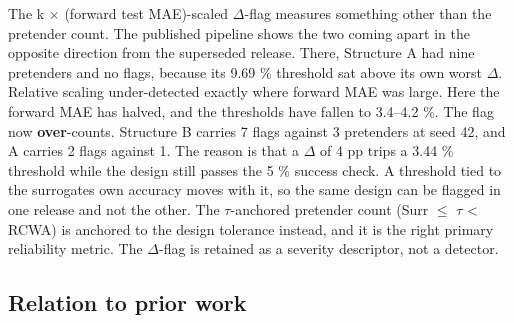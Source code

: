 \documentclass[11pt,a4paper]{article}
\begin{document}
The k \ensuremath{\times} (forward test MAE)-scaled \ensuremath{\Delta}-flag measures something other than the pretender
count. The published pipeline shows the two coming apart in the opposite direction from
the superseded release. There, Structure A had nine pretenders and no flags, because its
9.69 \% threshold sat above its own worst \ensuremath{\Delta}. Relative scaling under-detected exactly where
forward MAE was large. Here the forward MAE has halved, and the thresholds have fallen
to 3.4--4.2 \%. The flag now \textbf{over}-counts. Structure B carries 7 flags against 3
pretenders at seed 42, and A carries 2 flags against 1. The reason is that a \ensuremath{\Delta} of 4 pp
trips a 3.44 \% threshold while the design still passes the 5 \% success check. A threshold
tied to the surrogate\textquotesingle s own accuracy moves with it, so the same design can be flagged in
one release and not the other. The \ensuremath{\tau}-anchored pretender count (Surr \ensuremath{\leq} \ensuremath{\tau} \textless{} RCWA) is
anchored to the design tolerance instead, and it is the right primary reliability metric.
The \ensuremath{\Delta}-flag is retained as a severity descriptor, not a detector.

\subsection{Relation to prior work}\label{sec:4.6}
\end{document}

